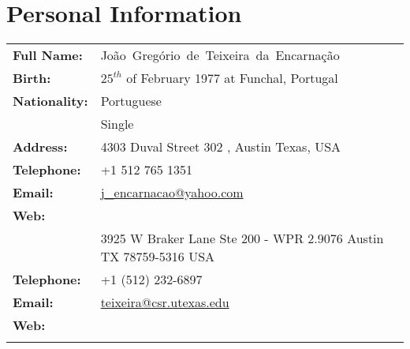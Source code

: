 \documentclass[a4paper]{article}
\newcommand{\dynhref}[2]{%
  \iftoggle{expliciturl}{%
    #2 (\href{#1}{\texttt{\detokenize{#1}}})%
  }{%
    \href{#1}{#2}%
  }%
}
\newcommand{\homecv}[2]{\iftoggle{homecontact}{#1}{#2}}
\newlength{\listskipsmall}
\newenvironment{cvsection}[2]{
  \vspace{0.15in}
  \section*{#1}
  \vspace{-0.2in}
  \begin{longtable}{lp{#2}}
}{
  \end{longtable}
}
\begin{document}
\begin{cvsection}{Personal Information}{14cm}

{\bf Full Name:} & Jo\~ao~Greg\'orio~de~Teixeira~da~Encarna\c c\~ao \\[\listskipsmall]
{\bf Birth:} & $25^{th}$ of February 1977 at Funchal, Portugal \\[\listskipsmall]
{\bf Nationality:} &  Portuguese\\[\listskipsmall]

\homecv{%
  {\bf Marital Status:} & Single \\[\listskipsmall]
  {\bf Address:}   & 4303 Duval Street 302 \newline
                    78751, Austin Texas, USA\\[\listskipsmall]
  {\bf Telephone:} & +1 512 765 1351\\[\listskipsmall]
  {\bf Email:}     & \href{mailto:j_encarnacao@yahoo.com}{j\_encarnacao@yahoo.com}\\[\listskipsmall]
  {\bf Web:}       & \dynhref{http://nl.linkedin.com/in/joaoencarnacao}{LinkedIn}\\[\listskipsmall]
}{%
  {\bf Address:}   & 3925 W Braker Lane Ste 200 - WPR 2.9076\newline
                     Austin TX 78759-5316\newline
                    USA\\[\listskipsmall]
  {\bf Telephone:} & +1 (512) 232-6897\\[\listskipsmall]
  {\bf Email:}     & \href{mailto:teixeira@csr.utexas.edu}{teixeira@csr.utexas.edu}\\[\listskipsmall]
  {\bf Web:}       & \dynhref{https://directory.utexas.edu/index.php?q=joao+encarnacao}{University of Texas}\newline
                     \dynhref{http://nl.linkedin.com/in/joaoencarnacao}{LinkedIn}\newline
                     \dynhref{https://www.researchgate.net/profile/Joao_Encarnacao2}{ResearchGate}\newline
                     \dynhref{https://scholar.google.com/citations?user=k2liFwQAAAAJ}{Google Scholar}\newline
                     \dynhref{http://orcid.org/0000-0001-6824-2733}{ORCID}\newline
                     \dynhref{https://www.mendeley.com/profiles/joao-encarnacao4/}{Mendeley}\newline
                     \dynhref{https://www.scopus.com/authid/detail.uri?authorId=15135565900}{SCOPUS}\newline
                     \dynhref{https://publons.com/a/782170/}{Publons}\newline
                     \dynhref{https://github.com/jgte}{GitHub}\\[\listskipsmall]
}
\end{cvsection}
\end{document}
